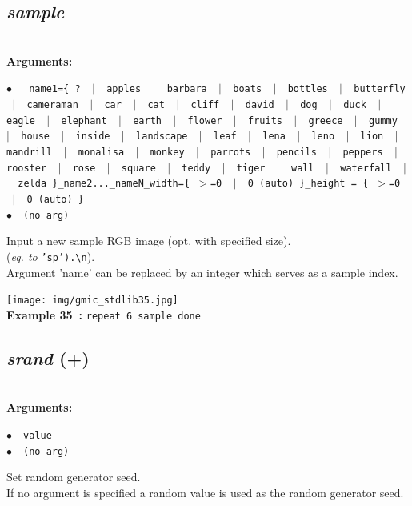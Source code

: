 \documentclass[a4paper,10.5pt,twoside]{book}
\def\comma{\discretionary{,}{}{,}}
\newcommand{\Cb}[1]{\textcolor{cb}{#1}}
\begin{document}
\subsection{\emph{sample} }\vspace*{-0.7em}
~\\\textbf{\Cb{Arguments: }}\begin{flushleft}
{\small \Cb{\hspace*{0.5cm}$\bullet$~~\texttt{\_name1=\{ ? ~$|$~ apples ~$|$~ barbara ~$|$~ boats ~$|$~ bottles ~$|$~ butterfly \-~$|$~ cameraman ~$|$~ car ~$|$~ cat ~$|$~ cliff ~$|$~ david ~$|$~ dog ~$|$~ duck ~$|$~ eagle\- ~$|$~ elephant ~$|$~ earth ~$|$~ flower ~$|$~ fruits ~$|$~ greece ~$|$~ gummy ~$|$~ hou\-se ~$|$~ inside ~$|$~ landscape ~$|$~ leaf ~$|$~ lena ~$|$~ leno ~$|$~ lion ~$|$~ mandri\-ll ~$|$~ monalisa ~$|$~ monkey ~$|$~ parrots ~$|$~ pencils ~$|$~ peppers ~$|$~ roost\-er ~$|$~ rose ~$|$~ square ~$|$~ teddy ~$|$~ tiger ~$|$~ wall ~$|$~ waterfall ~$|$~ zeld\-a \}{\comma}\_name2{\comma}...{\comma}\_nameN{\comma}\_width=\{ $>$=0 ~$|$~ 0 (auto) \}{\comma}\_height = \{ \-$>$=0 ~$|$~ 0 (auto) \}}}}~~~\\
{\small \Cb{\hspace*{0.5cm}$\bullet$~~\texttt{(no arg)}}}\end{flushleft}
Input a new sample RGB image (opt. with specified size).
~\\(\emph{eq. to} {\small \texttt{'sp').\textbackslash n}}).
~\\Argument 'name' can be replaced by an integer which serves as a sample index.
\begin{center}\texttt{[image: img/gmic\_stdlib35.jpg]}\\
{\footnotesize \textbf{Example 35~:} \texttt{repeat 6 sample done}}
\end{center}

\subsection{\emph{srand} (+)}\vspace*{-0.7em}
~\\\textbf{\Cb{Arguments: }}\begin{flushleft}
{\small \Cb{\hspace*{0.5cm}$\bullet$~~\texttt{value}}}~~~\\
{\small \Cb{\hspace*{0.5cm}$\bullet$~~\texttt{(no arg)}}}\end{flushleft}
Set random generator seed.
~\\If no argument is specified{\comma} a random value is used as the random generator seed.
\end{document}
